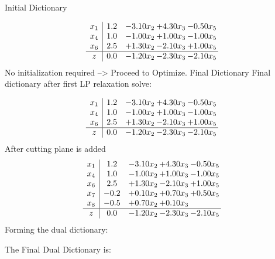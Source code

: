 \documentclass[8pt]{article}
\begin{document}
Initial Dictionary 

\[\begin{array}{c| c c@{\hskip 2pt} c@{\hskip 2pt} c@{\hskip 2pt} }
 x_{1}   &  1.2 & -3.10 x_{2} & +  4.30 x_{3} & -0.50 x_{5}\\
 x_{4}   &  1.0 & -1.00 x_{2} & +  1.00 x_{3} & -1.00 x_{5}\\
 x_{6}   &  2.5 & +  1.30 x_{2} & -2.10 x_{3} & +  1.00 x_{5}\\
\hline
z    &  0.0 & -1.20 x_{2} & -2.30 x_{3} & -2.10 x_{5}\\
\end{array}\]
No initialization required --> Proceed to Optimize. 
Final Dictionary
Final dictionary after first LP relaxation solve: 

\[\begin{array}{c| c c@{\hskip 2pt} c@{\hskip 2pt} c@{\hskip 2pt} }
 x_{1}   &  1.2 & -3.10 x_{2} & +  4.30 x_{3} & -0.50 x_{5}\\
 x_{4}   &  1.0 & -1.00 x_{2} & +  1.00 x_{3} & -1.00 x_{5}\\
 x_{6}   &  2.5 & +  1.30 x_{2} & -2.10 x_{3} & +  1.00 x_{5}\\
\hline
z    &  0.0 & -1.20 x_{2} & -2.30 x_{3} & -2.10 x_{5}\\
\end{array}\]
 After cutting plane is added 
\[\begin{array}{c| c c@{\hskip 2pt} c@{\hskip 2pt} c@{\hskip 2pt} }
 x_{1}   &  1.2 & -3.10 x_{2} & +  4.30 x_{3} & -0.50 x_{5}\\
 x_{4}   &  1.0 & -1.00 x_{2} & +  1.00 x_{3} & -1.00 x_{5}\\
 x_{6}   &  2.5 & +  1.30 x_{2} & -2.10 x_{3} & +  1.00 x_{5}\\
 x_{7}   &  -0.2 & +  0.10 x_{2} & +  0.70 x_{3} & +  0.50 x_{5}\\
 x_{8}   &  -0.5 & +  0.70 x_{2} & +  0.10 x_{3} &   \\
\hline
z    &  0.0 & -1.20 x_{2} & -2.30 x_{3} & -2.10 x_{5}\\
\end{array}\]
Forming the dual dictionary:

The Final Dual Dictionary is: 
\end{document}
